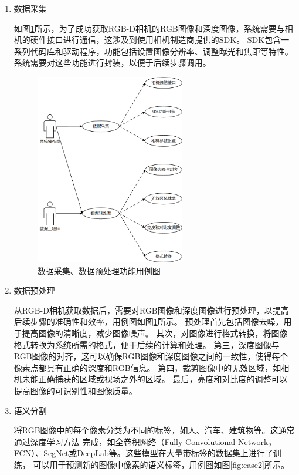 \begin{enumerate}
	\item{数据采集}
	\par 如图\ref{fig:case1}所示，为了成功获取RGB-D相机的RGB图像和深度图像，系统需要与相机的硬件接口进行通信，这涉及到使用相机制造商提供的SDK。
	SDK包含一系列代码库和驱动程序，功能包括设置图像分辨率、调整曝光和焦距等特性。
	系统需要对这些功能进行封装，以便于后续步骤调用。

	\begin{figure}[htb]
		\centering
		\includegraphics[width=0.618\textwidth]{figures/uml/case1.png}
		\caption{数据采集、数据预处理功能用例图}
		\label{fig:case1}
	\end{figure}

	\item{数据预处理}
	\par 从RGB-D相机获取数据后，需要对RGB图像和深度图像进行预处理，以提高后续步骤的准确性和效率，用例图如图\ref{fig:case1}所示。
	预处理首先包括图像去噪，用于提高图像的清晰度，减少图像噪声。
	其次，对图像进行格式转换，将图像格式转换为系统所需的格式，便于后续的计算和处理。
	第三，深度图像与RGB图像的对齐，这可以确保RGB图像和深度图像之间的一致性，使得每个像素点都具有正确的深度和RGB信息。
	第四，裁剪图像中的无效区域，如相机未能正确捕获的区域或视场之外的区域。
	最后，亮度和对比度的调整可以提高图像的可识别性和图像质量。

	\item{语义分割}
	\par 将RGB图像中的每个像素分类为不同的标签，如人、汽车、建筑物等。这通常通过深度学习方法
	完成，如全卷积网络（Fully Convolutional Network，FCN）、SegNet或DeepLab等。这些模型在大量带标签的数据集上进行了训练，
	可以用于预测新的图像中像素的语义标签，用例图如图\ref{fig:case2}所示。


\end{enumerate}
